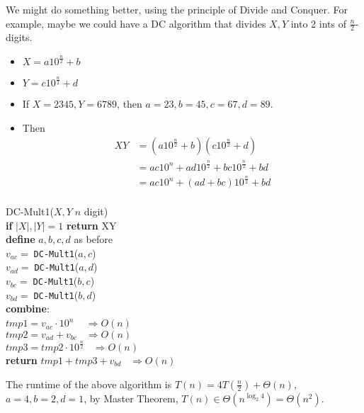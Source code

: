 \documentclass[twoside]{article}
\newcommand{\pc}[1]{\mbox{\textbf{#1}}} %
\begin{document}
We might do something better, using the principle of Divide and Conquer. For example, maybe we could have a DC algorithm that divides $X, Y$ into 2 ints of $\frac{n}{2}$-digits. 
\begin{itemize}
	\item $X = a10^{\frac{n}{2}} + b$
	\item $Y = c10^{\frac{n}{2}} + d$
	\item If $X = 2345, Y = 6789$, then $a=23, b=45, c=67,d=89$. 
	\item Then \begin{align*}
	      XY &= (a10^{\frac{n}{2}} + b)(c10^{\frac{n}{2}} + d)\\
	      &=ac10^n + ad10^{\frac{n}{2}} + bc10^{\frac{n}{2}}+bd\\
	      &=ac10^n + (ad+bc)10^{\frac{n}{2}}+bd\\
	\end{align*}
\end{itemize}
\begin{algorithme}
	DC-Mult1($X, Y\; n$ digit)\\
	\> \pc{if} $|X|,|Y| = 1$ \pc{return} XY\\
	\>\pc{define} $a,b,c,d$ as before\\
	\>$v_{ac} = \;$\texttt{DC-Mult1}($a,c$)\\
	\>$v_{ad} = \;$\texttt{DC-Mult1}($a,d$)\\
	\>$v_{bc} = \;$\texttt{DC-Mult1}($b,c$)\\
	\>$v_{bd} = \;$\texttt{DC-Mult1}($b,d$)\\
	\>\pc{combine}: \\
	\>\>$tmp1 = v_{ac}\cdot10^n$ $\;\;\;\Rightarrow O(n)$\\
	\>\>$tmp2 = v_{ad}+v_{bc}$$\;\;\;\Rightarrow O(n)$\\
	\>\>$tmp3 = tmp2 \cdot 10^{\frac{n}{2}}$$\;\;\;\Rightarrow O(n)$\\
	\>\pc{return} $tmp1 + tmp3+ v_{bd}$$\;\;\;\Rightarrow O(n)$
\end{algorithme}
The runtime of the above algorithm is $T(n) = 4T(\frac{n}{2}) + \Theta(n)$, $a = 4, b =2, d = 1$, by Master Theorem, $T(n) \in \Theta(n^{\log_2 4}) = \Theta(n^2)$. 
\end{document}
